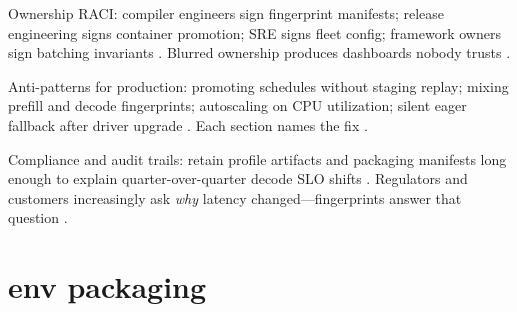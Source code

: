 Ownership RACI: compiler engineers sign fingerprint manifests; release engineering signs container promotion; SRE signs fleet config; framework owners sign batching invariants \citep{kwon2023vllm,patel2025llminference,yirage2026,chen2020compilerbasedhardw,liu2024deepseekv3,memoryfloor2026,taxbreak2026,amd2024aie,dlbook,semianalysis2024tma,amd2024xdna,dao2022flashattention,dao2023flashdecoding,nvidia2024cudagraphs,nvidia2022hopper}. Blurred ownership produces dashboards nobody trusts \citep{patel2025llminference,yirage2026,chen2020compilerbasedhardw,memoryfloor2026,taxbreak2026,kwon2023vllm,liu2024deepseekv3,amd2024aie,dlbook,semianalysis2024tma,amd2024xdna,dao2022flashattention,dao2023flashdecoding,nvidia2024cudagraphs,nvidia2022hopper}.

Anti-patterns for production: promoting schedules without staging replay; mixing prefill and decode fingerprints; autoscaling on CPU utilization; silent eager fallback after driver upgrade \citep{nvidia2024cudagraphs,memoryfloor2026,kwon2023vllm,patel2025llminference,taxbreak2026,yirage2026,chen2020compilerbasedhardw,liu2024deepseekv3,amd2024aie,dlbook,semianalysis2024tma,amd2024xdna,dao2022flashattention,dao2023flashdecoding,nvidia2024cudagraphs,nvidia2022hopper}. Each section names the fix \citep{yirage2026,chen2020compilerbasedhardw,patel2025llminference,memoryfloor2026,taxbreak2026,kwon2023vllm,liu2024deepseekv3,amd2024aie,dlbook,semianalysis2024tma,amd2024xdna,dao2022flashattention,dao2023flashdecoding,nvidia2024cudagraphs,nvidia2022hopper}.

Compliance and audit trails: retain profile artifacts and packaging manifests long enough to explain quarter-over-quarter decode SLO shifts \citep{patel2025llminference,yirage2026,chen2020compilerbasedhardw,memoryfloor2026,taxbreak2026,kwon2023vllm,liu2024deepseekv3,amd2024aie,dlbook,semianalysis2024tma,amd2024xdna,dao2022flashattention,dao2023flashdecoding,nvidia2024cudagraphs,nvidia2022hopper}. Regulators and customers increasingly ask \emph{why} latency changed---fingerprints answer that question \citep{patel2025llminference,yirage2026,chen2020compilerbasedhardw,memoryfloor2026,taxbreak2026,kwon2023vllm,liu2024deepseekv3,amd2024aie,dlbook,semianalysis2024tma,amd2024xdna,dao2022flashattention,dao2023flashdecoding,nvidia2024cudagraphs,nvidia2022hopper}.

\section{env packaging}
\label{sec:ch26_env_packaging}

